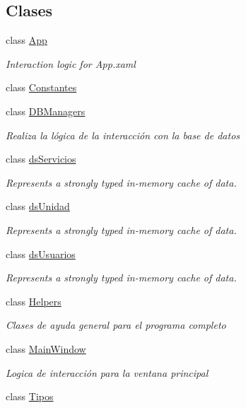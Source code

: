 \subsection*{Clases}
\begin{DoxyCompactItemize}
\item 
class \hyperlink{class_proyecto___integrador__3_1_1_app}{App}
\begin{DoxyCompactList}\small\item\em Interaction logic for App.\-xaml \end{DoxyCompactList}\item 
class \hyperlink{class_proyecto___integrador__3_1_1_constantes}{Constantes}
\item 
class \hyperlink{class_proyecto___integrador__3_1_1_d_b_managers}{D\-B\-Managers}
\begin{DoxyCompactList}\small\item\em Realiza la lógica de la interacción con la base de datos \end{DoxyCompactList}\item 
class \hyperlink{class_proyecto___integrador__3_1_1ds_servicios}{ds\-Servicios}
\begin{DoxyCompactList}\small\item\em Represents a strongly typed in-\/memory cache of data. \end{DoxyCompactList}\item 
class \hyperlink{class_proyecto___integrador__3_1_1ds_unidad}{ds\-Unidad}
\begin{DoxyCompactList}\small\item\em Represents a strongly typed in-\/memory cache of data. \end{DoxyCompactList}\item 
class \hyperlink{class_proyecto___integrador__3_1_1ds_usuarios}{ds\-Usuarios}
\begin{DoxyCompactList}\small\item\em Represents a strongly typed in-\/memory cache of data. \end{DoxyCompactList}\item 
class \hyperlink{class_proyecto___integrador__3_1_1_helpers}{Helpers}
\begin{DoxyCompactList}\small\item\em Clases de ayuda general para el programa completo \end{DoxyCompactList}\item 
class \hyperlink{class_proyecto___integrador__3_1_1_main_window}{Main\-Window}
\begin{DoxyCompactList}\small\item\em Logica de interacción para la ventana principal \end{DoxyCompactList}\item 
class \hyperlink{class_proyecto___integrador__3_1_1_tipos}{Tipos}
\end{DoxyCompactItemize}
